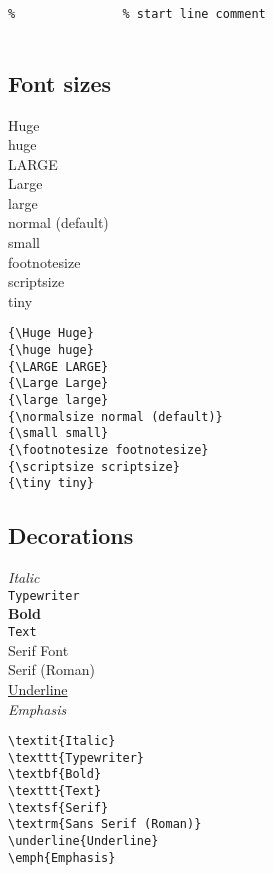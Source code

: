 \documentclass[a4paper,11pt,fleqn]{book}
\begin{document}
\begin{enumerate}
\begin{verbatim}
%               % start line comment


\end{verbatim}

\subsection{Font sizes}
\begin{multicols}{2}
  {\Huge Huge}\\{\huge huge}\\{\LARGE LARGE}\\{\Large Large}\\{\large large}\\{\normalsize normal (default)}\\{\small small}\\{\footnotesize footnotesize}\\{\scriptsize scriptsize}\\{\tiny tiny}

  \vfill\null\columnbreak

  \begin{verbatim}
{\Huge Huge}
{\huge huge}
{\LARGE LARGE}
{\Large Large}
{\large large}
{\normalsize normal (default)}
{\small small}
{\footnotesize footnotesize}
{\scriptsize scriptsize}
{\tiny tiny}
  \end{verbatim}
\end{multicols}

\subsection{Decorations}
\begin{multicols}{2}
  \textit{Italic}\\\texttt{Typewriter}\\\textbf{Bold}\\\texttt{Text}\\\textsf{Serif Font}\\\textrm{Serif (Roman)}\\\underline{Underline}\\\emph{Emphasis}\\

  \vfill\null\columnbreak

  \begin{verbatim}
\textit{Italic}
\texttt{Typewriter}
\textbf{Bold}
\texttt{Text}
\textsf{Serif}
\textrm{Sans Serif (Roman)}
\underline{Underline}
\emph{Emphasis}
  \end{verbatim}
\end{multicols}


\end{enumerate}
\end{document}
